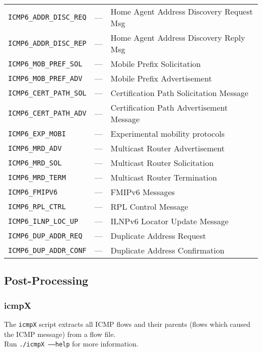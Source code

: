 \documentclass[documentation]{subfiles}
\begin{document}
\begin{longtable}{lll}
    {\tt ICMP6\_ADDR\_DISC\_REQ}   & ---                            & Home Agent Address Discovery Request Msg\\
    {\tt ICMP6\_ADDR\_DISC\_REP}   & ---                            & Home Agent Address Discovery Reply Msg\\
    {\tt ICMP6\_MOB\_PREF\_SOL}    & ---                            & Mobile Prefix Solicitation\\
    {\tt ICMP6\_MOB\_PREF\_ADV}    & ---                            & Mobile Prefix Advertisement\\
    {\tt ICMP6\_CERT\_PATH\_SOL}   & ---                            & Certification Path Solicitation Message\\
    {\tt ICMP6\_CERT\_PATH\_ADV}   & ---                            & Certification Path Advertisement Message\\
    {\tt ICMP6\_EXP\_MOBI}         & ---                            & Experimental mobility protocols\\
    {\tt ICMP6\_MRD\_ADV}          & ---                            & Multicast Router Advertisement\\
    {\tt ICMP6\_MRD\_SOL}          & ---                            & Multicast Router Solicitation\\
    {\tt ICMP6\_MRD\_TERM}         & ---                            & Multicast Router Termination\\
    {\tt ICMP6\_FMIPV6}            & ---                            & FMIPv6 Messages\\
    {\tt ICMP6\_RPL\_CTRL}         & ---                            & RPL Control Message\\
    {\tt ICMP6\_ILNP\_LOC\_UP}     & ---                            & ILNPv6 Locator Update Message\\
    {\tt ICMP6\_DUP\_ADDR\_REQ}    & ---                            & Duplicate Address Request\\
    {\tt ICMP6\_DUP\_ADDR\_CONF}   & ---                            & Duplicate Address Confirmation\\
    \bottomrule
\end{longtable}

\subsection{Post-Processing}

\subsubsection{icmpX}
The {\tt icmpX} script extracts all ICMP flows and their parents (flows which caused the ICMP message) from a flow file.\\
Run {\tt ./icmpX --{}--help} for more information.
\end{document}
